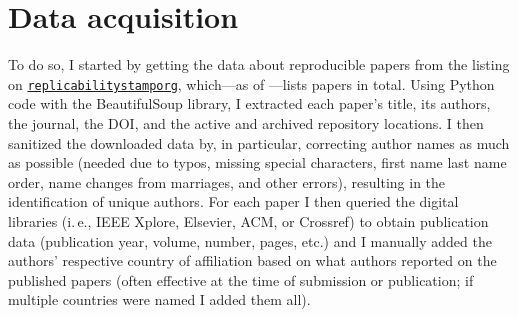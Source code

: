\documentclass[conference,svgnames]{vgtc}                     %
\newcommand{\ie}{i.\,e.}
\begin{document}
\section{Data acquisition}
\label{sec:data}

To do so, I started by getting the data about reproducible papers from the listing on \href{https://www.replicabilitystamp.org/}{\texttt{replicabilitystamporg}}, which---as of \GrsiDataCurrentAsOf---lists \GrsiTotalPapers{} papers in total. Using Python code with the BeautifulSoup library, I extracted each paper's title, its authors, the journal, the DOI, and the active and archived repository locations. I then sanitized the downloaded data by, in particular, correcting author names as much as possible (needed due to typos, missing special characters, first name last name order, name changes from marriages, and other errors), resulting in the identification of \GrsiTotalAuthors{} unique authors. For each paper I then queried the digital libraries (\ie, IEEE Xplore, Elsevier, ACM, or Crossref) to obtain publication data (publication year, volume, number, pages, etc.) and I manually added the authors' respective country of affiliation based on what authors reported on the published papers (often effective at the time of submission or publication; if multiple countries were named I added them all).
\end{document}
